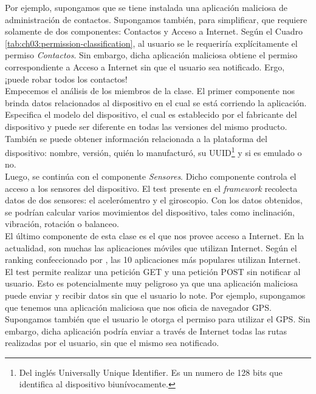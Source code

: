 Por ejemplo, supongamos que se tiene instalada una aplicación maliciosa de administración de contactos. Supongamos también, para simplificar, que requiere solamente de dos componentes: Contactos y Acceso a Internet. Según el Cuadro \ref{tab:ch03:permission-classification}, al usuario se le requeriría explícitamente el permiso \emph{Contactos}. Sin embargo, dicha aplicación maliciosa obtiene el permiso correspondiente a Acceso a Internet sin que el usuario sea notificado. Ergo, ¡puede robar todos los contactos!\\

Empecemos el análisis de los miembros de la clase. El primer componente nos brinda datos relacionados al dispositivo en el cual se está corriendo la aplicación. Especifica el modelo del dispositivo, el cual es establecido por el fabricante del dispositivo y puede ser diferente en todas las versiones del mismo producto. También se puede obtener información relacionada a la plataforma del dispositivo: nombre, versión, quién lo manufacturó, su UUID\footnote{Del inglés Universally Unique Identifier. Es un numero de 128 bits que identifica al dispositivo biunívocamente.} y si es emulado o no.\\

Luego, se continúa con el componente \emph{Sensores}. Dicho componente controla el acceso a los sensores del dispositivo. El test presente en el \textit{framework} recolecta datos de dos sensores: el acelerómentro y el giroscopio. Con los datos obtenidos, se podrían calcular varios movimientos del dispositivo, tales como inclinación, vibración, rotación o balanceo.\\

El último componente de esta clase es el que nos provee acceso a Internet. En la actualidad, son muchas las aplicaciones móviles que utilizan Internet. Según el ranking confeccionado por \cite{BOA}, las 10 aplicaciones más populares utilizan Internet. El test permite realizar una petición GET y una petición POST sin notificar al usuario. Esto es potencialmente muy peligroso ya que una aplicación maliciosa puede enviar y recibir datos sin que el usuario lo note. Por ejemplo, supongamos que tenemos una aplicación maliciosa que nos oficia de navegador GPS. Supongamos también que el usuario le otorga el permiso para utilizar el GPS. Sin embargo, dicha aplicación podría enviar a través de Internet todas las rutas realizadas por el usuario, sin que el mismo sea notificado.